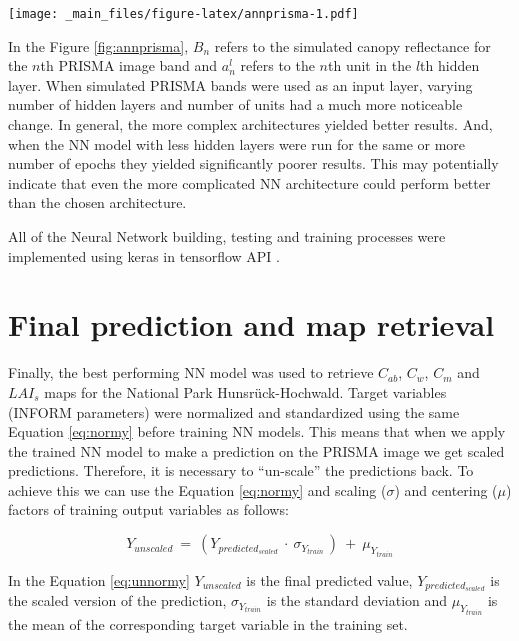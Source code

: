 \documentclass[a4paper, twoside]{templates/ociamthesis}
\let\origfigure\figure
\let\endorigfigure\endfigure
\renewenvironment{figure}[1][2] {
    \expandafter\origfigure\expandafter[H]
} {
    \endorigfigure
}
\begin{document}
\begin{figure}
\centering
\texttt{[image: \_main\_files/figure-latex/annprisma-1.pdf]}
\caption{\label{fig:annprisma}Architecture of the Neural Network with simulated PRISMA image bands as inputs}
\end{figure}

In the Figure \ref{fig:annprisma}, \(B_{n}\) refers to the simulated canopy reflectance for the \(n\)th PRISMA image band and \(a_{n}^{l}\) refers to the \(n\)th unit in the \(l\)th hidden layer. When simulated PRISMA bands were used as an input layer, varying number of hidden layers and number of units had a much more noticeable change. In general, the more complex architectures yielded better results. And, when the NN model with less hidden layers were run for the same or more number of epochs they yielded significantly poorer results. This may potentially indicate that even the more complicated NN architecture could perform better than the chosen architecture.

All of the Neural Network building, testing and training processes were implemented using keras \citep{keras} in tensorflow API \citep{tensorflow}.

\hypertarget{final-prediction-and-map-retrieval}{%
\section{Final prediction and map retrieval}\label{final-prediction-and-map-retrieval}}

Finally, the best performing NN model was used to retrieve \(C_{ab}\), \(C_{w}\), \(C_{m}\) and \(LAI_{s}\) maps for the National Park Hunsrück-Hochwald. Target variables (INFORM parameters) were normalized and standardized using the same Equation \eqref{eq:normy} before training NN models. This means that when we apply the trained NN model to make a prediction on the PRISMA image we get scaled predictions. Therefore, it is necessary to ``un-scale'' the predictions back. To achieve this we can use the Equation \eqref{eq:normy} and scaling (\(\sigma\)) and centering (\(\mu\)) factors of training output variables as follows:

\begin{equation}
Y_{unscaled}\ =\ \left(Y_{predicted_{scaled}}\ \cdot\ \sigma_{Y_{train}\ }\right)\ +\ \mu_{Y_{train}}
\label{eq:unnormy}
\end{equation}

In the Equation \eqref{eq:unnormy} \(Y_{unscaled}\) is the final predicted value, \(Y_{predicted_{scaled}}\) is the scaled version of the prediction, \(\sigma_{Y_{train}}\) is the standard deviation and \(\mu_{Y_{train}}\) is the mean of the corresponding target variable in the training set.
\end{document}
